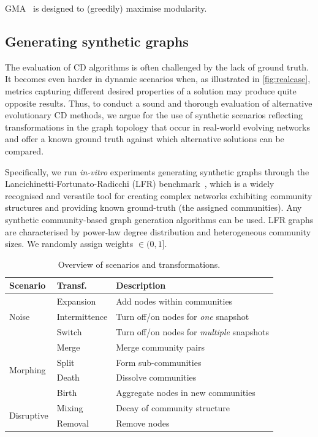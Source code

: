 \documentclass[letterpaper]{article}
\begin{document}
GMA~\cite{blondel2008louvain} is designed to (greedily) maximise modularity.

\subsection{Generating synthetic graphs}

The evaluation of CD algorithms is often challenged by the lack of ground truth. It becomes even harder in dynamic scenarios when, as illustrated in \cref{fig:realcase}, metrics capturing different desired properties of a solution may produce quite opposite results. Thus, to conduct a sound and thorough evaluation of alternative evolutionary CD methods, we argue for the use of synthetic scenarios reflecting transformations in the graph topology that occur in real-world evolving networks and offer a known ground truth against which alternative solutions can be compared.

Specifically, we run \emph{in-vitro}  experiments generating synthetic graphs through the Lancichinetti-Fortunato-Radicchi (LFR) benchmark~\cite{lancichinetti2008benchmark}, which is a widely recognised and versatile tool for creating complex networks exhibiting community structures and providing known ground-truth (\ie the assigned communities). Any synthetic community-based graph generation algorithms can be used. LFR graphs are characterised by power-law degree distribution and heterogeneous community sizes. We randomly assign weights $\in (0,1]$.
\begin{table}[!t]
\centering
\footnotesize
\setlength{\tabcolsep}{2pt}
\caption{Overview of scenarios and transformations.}
\label{tab:events}
\begin{tabular}{lll}
\toprule
\textbf{Scenario} & \textbf{Transf.} & \textbf{Description} \\
\midrule
\multirow{3}{*}{Noise} & Expansion & Add nodes within communities\\
 & Intermittence & Turn off/on nodes for \emph{one} snapshot \\
 & Switch & Turn off/on nodes for \emph{multiple} snapshots \\
\midrule
\multirow{4}{*}{Morphing} & Merge & Merge community pairs \\
 & Split & Form sub-communities \\
 & Death & Dissolve communities \\
 & Birth & Aggregate nodes in new communities \\
\midrule
\multirow{2}{*}{Disruptive} & Mixing & Decay of community structure \\
 & Removal & Remove nodes \\
 \bottomrule
\end{tabular}
\end{table}
\end{document}

